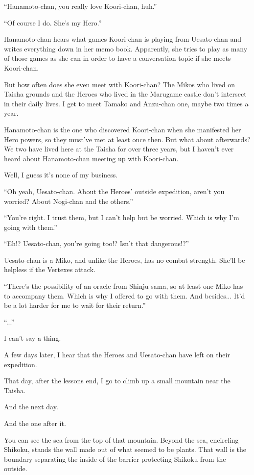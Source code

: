 ``Hanamoto-chan, you really love Koori-chan, huh.''

``Of course I do. She's my Hero.''

Hanamoto-chan hears what games Koori-chan is playing from Uesato-chan and writes everything down in her memo book. Apparently, she tries to play as many of those games as she can in order to have a conversation topic if she meets Koori-chan.

But how often does she even meet with Koori-chan? The Mikos who lived on Taisha grounds and the Heroes who lived in the Marugame castle don't intersect in their daily lives. I get to meet Tamako and Anzu-chan one, maybe two times a year.

Hanamoto-chan is the one who discovered Koori-chan when she manifested her Hero powers, so they must've met at least once then. But what about afterwards? We two have lived here at the Taisha for over three years, but I haven't ever heard about Hanamoto-chan meeting up with Koori-chan.

Well, I guess it's none of my business.

``Oh yeah, Uesato-chan. About the Heroes' outside expedition, aren't you worried? About Nogi-chan and the others.''

``You're right. I trust them, but I can't help but be worried. Which is why I'm going with them.''

``Eh!? Uesato-chan, you're going too!? Isn't that dangerous!?''

Uesato-chan is a Miko, and unlike the Heroes, has no combat strength. She'll be helpless if the Vertexes attack.

``There's the possibility of an oracle from Shinju-sama, so at least one Miko has to accompany them. Which is why I offered to go with them. And besides... It'd be a lot harder for me to wait for their return.''

``...''

I can't say a thing.

A few days later, I hear that the Heroes and Uesato-chan have left on their expedition.

That day, after the lessons end, I go to climb up a small mountain near the Taisha.

And the next day.

And the one after it.

You can see the sea from the top of that mountain. Beyond the sea, encircling Shikoku, stands the wall made out of what seemed to be plants. That wall is the boundary separating the inside of the barrier protecting Shikoku from the outside.

